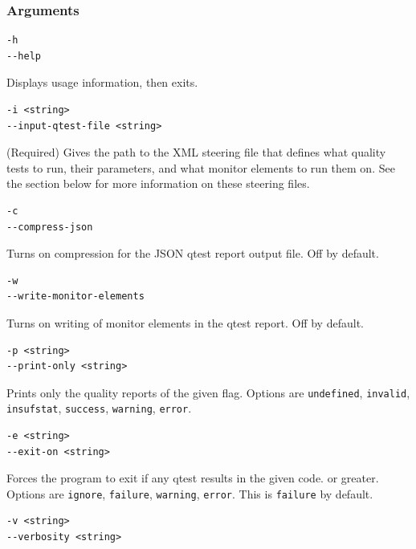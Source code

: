 \subsubsection{Arguments}

\begin{lstlisting}
-h
--help
\end{lstlisting}

Displays usage information, then exits.

\begin{lstlisting}
-i <string>
--input-qtest-file <string>
\end{lstlisting}

(Required) Gives the path to the \acrshort{XML} steering file that defines what quality tests to run, their parameters, and what monitor elements to run them on. See the section below for more information on these steering files.

\begin{lstlisting}
-c
--compress-json
\end{lstlisting}

Turns on compression for the \acrshort{JSON} \acrshort{qtest} report output file. Off by default.

\begin{lstlisting}
-w
--write-monitor-elements
\end{lstlisting}

Turns on writing of monitor elements in the \acrshort{qtest} report. Off by default.

\begin{lstlisting}
-p <string>
--print-only <string>
\end{lstlisting}

Prints only the quality reports of the given flag. Options are \texttt{undefined}, \texttt{invalid}, \texttt{insuf\textunderscore stat}, \texttt{success}, \texttt{warning}, \texttt{error}.

\begin{lstlisting}
-e <string>
--exit-on <string>
\end{lstlisting}

Forces the program to exit if any \acrshort{qtest} results in the given code. or greater. Options are \texttt{ignore}, \texttt{failure}, \texttt{warning}, \texttt{error}. This is \texttt{failure} by default.

\begin{lstlisting}
-v <string>
--verbosity <string>
\end{lstlisting}

